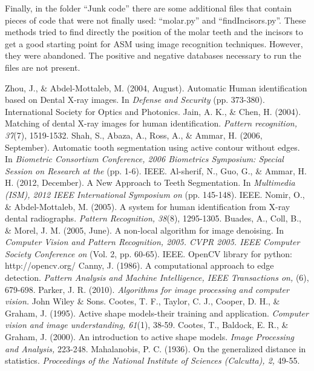 \documentclass[a4paper,11pt,twoside]{article}
\begin{document}
Finally, in the folder ``Junk code'' there are some additional files that contain pieces of code that were not finally used: ``molar.py'' and ``findIncisors.py''. These methods tried to find directly the position of the molar teeth and the incisors to get a good starting point for ASM using image recognition techniques. However, they were abandoned. The positive and negative databases necessary to run the files are not present.

\clearpage
\newpage

\begin{thebibliography}{11}
Zhou, J., \& Abdel-Mottaleb, M. (2004, August). Automatic Human identification based on Dental X-ray images. In \textit{Defense and Security} (pp. 373-380). International Society for Optics and Photonics.
Jain, A. K., \& Chen, H. (2004). Matching of dental X-ray images for human identification. \textit{Pattern recognition, 37}(7), 1519-1532.
Shah, S., Abaza, A., Ross, A., \& Ammar, H. (2006, September). Automatic tooth segmentation using active contour without edges. In \textit{Biometric Consortium Conference, 2006 Biometrics Symposium: Special Session on Research at the} (pp. 1-6). IEEE.
Al-sherif, N., Guo, G., \& Ammar, H. H. (2012, December). A New Approach to Teeth Segmentation. In \textit{Multimedia (ISM), 2012 IEEE International Symposium on} (pp. 145-148). IEEE.
Nomir, O., \& Abdel-Mottaleb, M. (2005). A system for human identification from X-ray dental radiographs. \textit{Pattern Recognition, 38}(8), 1295-1305.
Buades, A., Coll, B., \& Morel, J. M. (2005, June). A non-local algorithm for image denoising. In \textit{Computer Vision and Pattern Recognition, 2005. CVPR 2005. IEEE Computer Society Conference on} (Vol. 2, pp. 60-65). IEEE.
OpenCV library for python: http://opencv.org/
Canny, J. (1986). A computational approach to edge detection. \textit{Pattern Analysis and Machine Intelligence, IEEE Transactions on,} (6), 679-698.
Parker, J. R. (2010). \textit{Algorithms for image processing and computer vision.} John Wiley \& Sons.
Cootes, T. F., Taylor, C. J., Cooper, D. H., \& Graham, J. (1995). Active shape models-their training and application. \textit{Computer vision and image understanding, 61}(1), 38-59.
Cootes, T., Baldock, E. R., \& Graham, J. (2000). An introduction to active shape models. \textit{Image Processing and Analysis,} 223-248.
Mahalanobis, P. C. (1936). On the generalized distance in statistics. \textit{Proceedings of the National Institute of Sciences (Calcutta), 2,} 49-55.



\end{thebibliography}
\end{document}
